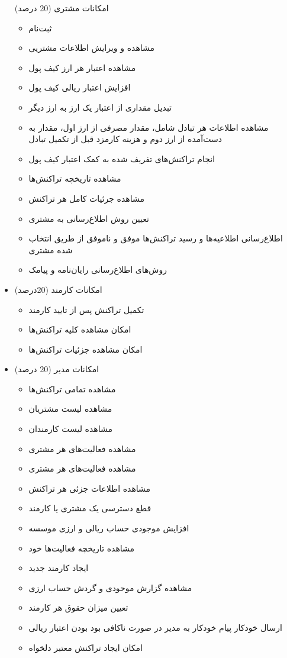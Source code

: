 \documentclass{article}
\begin{document}
\begin{itemize}
\begin{itemize}
\end{itemize}
امکانات مشتری (20 درصد)
\begin{itemize}
\item
ثبت‌نام
\item
مشاهده و ویرایش اطلاعات مشتریی 
\item
مشاهده اعتبار هر ارز کیف پول
\item
افزایش اعتبار ریالی کیف پول
\item
تبدیل مقداری از اعتبار یک ارز به ارز دیگر
\item
مشاهده اطلاعات هر تبادل شامل، مقدار مصرفی از ارز اول، مقدار به دست‌آمده از ارز دوم و هزینه کارمزد قبل از تکمیل تبادل
\item
انجام تراکنش‌های تفریف شده به کمک اعتبار کیف پول
\item
مشاهده تاریخچه تراکنش‌ها
\item
مشاهده جرئیات کامل هر تراکنش
\item
تعیین روش اطلاع‌رسانی به مشتری
\item
اطلاع‌رسانی اطلاعیه‌ها و رسید تراکنش‌ها موفق و ناموفق از طریق انتخاب شده مشتری
\item
روش‌های اطلاع‌رسانی رایان‌نامه و پیامک
\end{itemize}
\item
امکانات کارمند (20درصد)
\begin{itemize}
\item
تکمیل تراکنش پس از تایید کارمند
\item
امکان مشاهده کلیه تراکنش‌ها
\item
امکان مشاهده جزئیات تراکنش‌ها
\end{itemize}
\item
امکانات مدیر (20 درصد)
\begin{itemize}
\item
مشاهده تمامی تراکنش‌ها
\item
مشاهده لیست مشتریان
\item
مشاهده لیست کارمندان
\item
مشاهده فعالیت‌های هر مشتری
\item
مشاهده فعالیت‌های هر مشتری
\item
مشاهده اطلاعات جزئی هر تراکنش
\item
قطع دسترسی یک مشتری یا کارمند
\item
افزایش موجودی حساب ریالی و ارزی موسسه
\item
مشاهده تاریخچه فعالیت‌ها خود
\item
ایجاد کارمند جدید
\item
مشاهده گزارش موحودی و گردش حساب ارزی
\item
تعیین میزان حقوق هر کارمند
\item
ارسال خودکار پیام خودکار به مدیر در صورت ناکافی بود بودن اعتبار ریالی
\item
امکان ایجاد تراکنش معتبر دلخواه

\end{itemize}
\end{itemize}
\end{document}
